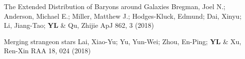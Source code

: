 \begin{etaremune}[topsep=0pt,itemsep=0pt,partopsep=0pt,parsep=0pt]
            {The Extended Distribution of Baryons around Galaxies}
            {Bregman, Joel N.; Anderson, Michael E.; Miller, Matthew J.; Hodges-Kluck, Edmund; Dai, Xinyu; Li, Jiang-Tao; \textbf{YL} \& Qu, Zhijie}
            {ApJ 862, 3 (2018)}
    
            {Merging strangeon stars}
            {Lai, Xiao-Yu; Yu, Yun-Wei; Zhou, En-Ping; \textbf{YL} \& Xu, Ren-Xin}
            {RAA 18, 024 (2018)}
    
\end{etaremune}
